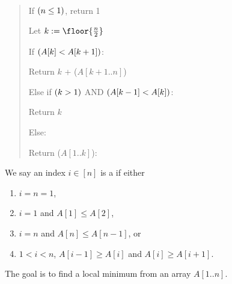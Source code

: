 \documentclass[10pt]{article}
\newcommand{\parof}[1]{\mleft( #1 \mright)}
\begin{document}
\begin{solution}\ %
\begin{quote}%
\noindent{}%


\begin{steps}
\item If \( \parof{n \leq 1} \), return 1
  \item Let \( k := \floor{\frac{n}{2}} \)
  \item If \( \parof{A[k] < A[k + 1]} \): %
    \begin{steps}
    \item Return $ k $ + (\( A[k+1..n]\))
    \end{steps}
  \item Else if $\parof{k > 1}$ AND $\parof{ A[k-1] < A[k] }$:
    \begin{steps}
    \item Return $ k $
    \end{steps}
  \item Else:
    \begin{steps}
    \item Return (\( A[1..k] \)):
    \end{steps}
\end{steps}
\end{quote}
\end{solution}
\pagebreak

We say an index $i \in [n]$ is a  if either
\begin{enumerate}[label=(\alph*)]
  \item $i = n = 1$,
  \item $i = 1$ and $A[1] \leq A[2]$,
  \item $i = n$ and $A[n] \leq A[n-1]$, or
  \item $1 < i < n$, $A[i-1] \geq A[i]$ and $A[i] \geq A[i + 1]$.
\end{enumerate}
The goal is to find a local minimum from an array $A[1..n]$.
\end{document}

